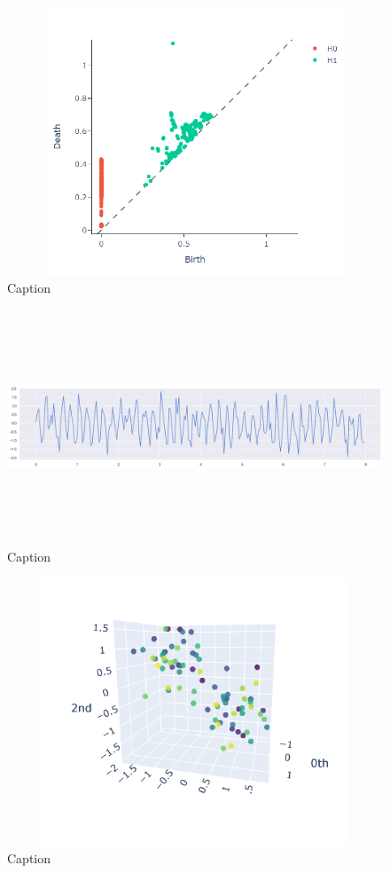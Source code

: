 \documentclass{article}
\begin{document}
\begin{figure}[h!]
    \centering
    \includegraphics[width= 12cm, height = 8cm]{PD sin with noise.png}
    \caption{Caption}
    \label{fig:enter-label}
\end{figure}


\begin{figure}[h!]
    \centering
    \includegraphics[width= 16cm, height = 7cm]{sin with gaussian noise.png}
    \caption{Caption}
    \label{fig:enter-label}
\end{figure}

\begin{figure}[h!]
    \centering
    \includegraphics[width= 12cm, height = 8cm]{PC sin w gaussian noise.png}
    \caption{Caption}
    \label{fig:enter-label}
\end{figure}
\end{document}
